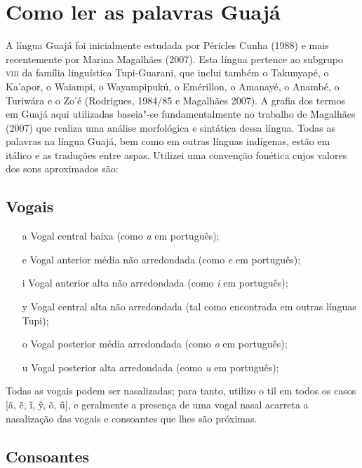 
\chapter{Como ler as palavras Guajá}


A língua Guajá foi inicialmente estudada por Péricles Cunha (1988) e
mais recentemente por Marina Magalhães (2007). Esta língua pertence ao
subgrupo \textsc{viii} da família linguística Tupi-Guarani, que inclui também o
Takunyapé, o Ka'apor, o Waiampi, o Wayampipukú, o Emérillon, o Amanayé,
o Anambé, o Turiwára e o Zo'é (Rodrigues, 1984/85 e Magalhães 2007). A
grafia dos termos em Guajá aqui utilizadas baseia"-se fundamentalmente no
trabalho de Magalhães (2007) que realiza uma análise morfológica e
sintática dessa língua. Todas as palavras na língua Guajá, bem como em
outras línguas indígenas, estão em itálico e as traduções entre aspas.
Utilizei uma convenção fonética cujos valores dos sons aproximados são:

\section{Vogais}

\begin{itemize}
\item[a] Vogal central baixa (como \emph{a} em português);

\item[e] Vogal anterior média não arredondada (como \emph{e} em português);

\item[i] Vogal anterior alta não arredondada (como \emph{i} em português);

\item[y] Vogal central alta não arredondada (tal como encontrada em outras línguas Tupi);

\item[o] Vogal posterior média arredondada (como \emph{o} em português);

\item[u] Vogal posterior alta arredondada (como \emph{u} em português);
\end{itemize} 


Todas as vogais podem ser nasalizadas; para tanto, utilizo o til em
todos os casos {[}ã, ẽ, ĩ, ỹ, õ, ũ{]}, e geralmente a presença de uma
vogal nasal acarreta a nasalização das vogais e consoantes que lhes são
próximas.

\section{Consoantes}

